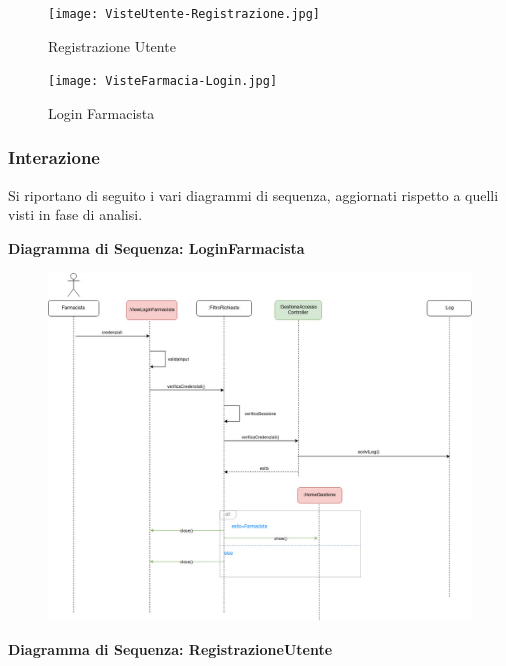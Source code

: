 \begin{figure}[h!]
    \centering
    \texttt{[image: VisteUtente-Registrazione.jpg]}
    \caption{Registrazione Utente}
\end{figure}
\newpage

\begin{figure}[h!]
    \centering
    \texttt{[image: VisteFarmacia-Login.jpg]}
    \caption{Login Farmacista}
\end{figure}
\newpage

\subsubsection{Interazione}

Si riportano di seguito i vari diagrammi di sequenza, aggiornati rispetto a quelli visti in fase di analisi.

\vspace{3em}

\textbf{Diagramma di Sequenza: LoginFarmacista}

\begin{figure}[h!]
    \begin{center}
        \includegraphics[width=\textwidth]{immagini/Interazione-LoginUtente-progettaz.jpg}
    \end{center}
\end{figure}

\newpage

\textbf{Diagramma di Sequenza: RegistrazioneUtente}

